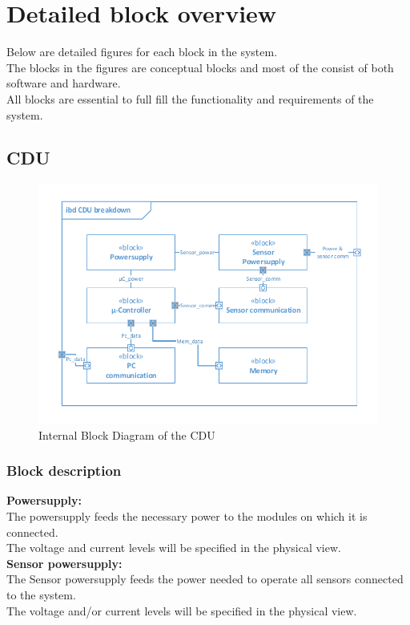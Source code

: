 \section{Detailed block overview}
Below are detailed figures for each block in the system.\\
The blocks in the figures are conceptual blocks and most of the consist of both software and hardware.\\
All blocks are essential to full fill the functionality and requirements of the system.

\subsection{CDU}

\begin{figure}[hbpt]
\centering
\includegraphics[width=.8\textwidth]{billeder/CDU_IBD}
\caption{Internal Block Diagram of the CDU}
\label{CDU_IBD}
\end{figure}

\subsubsection{Block description}

\textbf{Powersupply:}\\
The powersupply feeds the necessary power to the modules on which it is connected.\\
The voltage and current levels will be specified in the physical view.\\

\textbf{Sensor powersupply:}\\
The Sensor powersupply feeds the power needed to operate all sensors connected to the system.\\
The voltage and/or current levels will be specified in the physical view.\\

